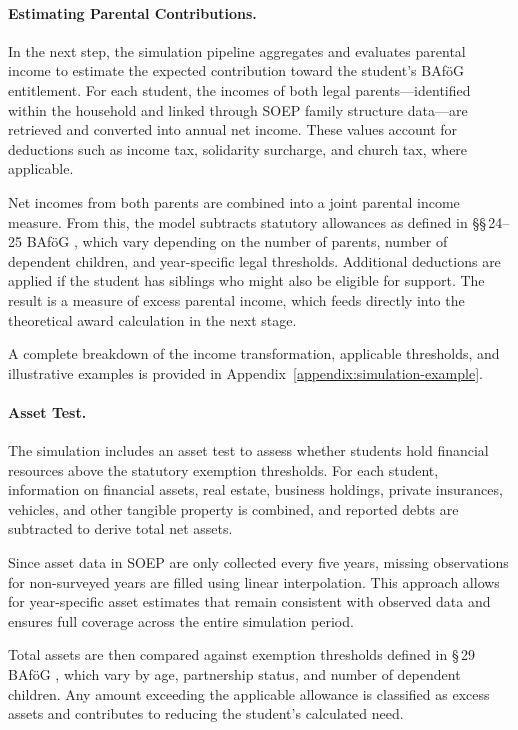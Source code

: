 \paragraph{Estimating Parental Contributions.}
In the next step, the simulation pipeline aggregates and evaluates parental income to estimate the expected contribution toward the student’s BAföG entitlement. 
For each student, the incomes of both legal parents—identified within the household and linked through SOEP family structure data—are retrieved and converted into annual net income. 
These values account for deductions such as income tax, solidarity surcharge, and church tax, where applicable.

Net incomes from both parents are combined into a joint parental income measure. 
From this, the model subtracts statutory allowances as defined in §§\,24–25 BAföG \citep{bafoeg_law}, which vary depending on the number of parents, number of dependent children, and year-specific legal thresholds. 
Additional deductions are applied if the student has siblings who might also be eligible for support. 
The result is a measure of excess parental income, which feeds directly into the theoretical award calculation in the next stage.

A complete breakdown of the income transformation, applicable thresholds, and illustrative examples is provided in Appendix~\ref{appendix:simulation-example}.

\paragraph{Asset Test.}
The simulation includes an asset test to assess whether students hold financial resources above the statutory exemption thresholds. 
For each student, information on financial assets, real estate, business holdings, private insurances, vehicles, and other tangible property is combined, and reported debts are subtracted to derive total net assets.

Since asset data in SOEP are only collected every five years, missing observations for non-surveyed years are filled using linear interpolation. 
This approach allows for year-specific asset estimates that remain consistent with observed data and ensures full coverage across the entire simulation period.

Total assets are then compared against exemption thresholds defined in §\,29 BAföG \citep{bafoeg_law}, which vary by age, partnership status, and number of dependent children. 
Any amount exceeding the applicable allowance is classified as excess assets and contributes to reducing the student's calculated need. 


